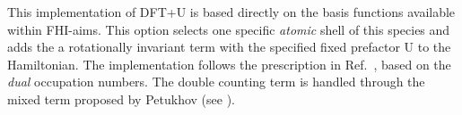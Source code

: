 This implementation of DFT+U is based directly on the basis functions available within FHI-aims.
This option selects one specific \textit{atomic} shell of this species and adds the a rotationally
invariant term with the specified fixed prefactor U to the Hamiltonian. The implementation follows
the prescription in Ref.~\cite{Han06}, based on the \textit{dual} occupation numbers. The double
counting term is handled through the mixed term proposed by Petukhov
(see ).
